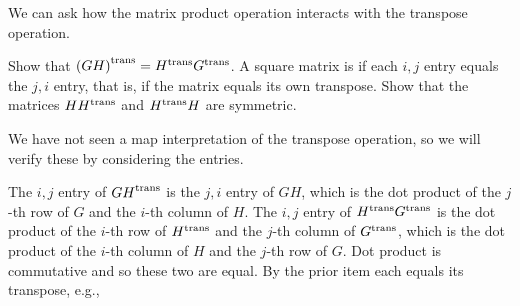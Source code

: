 \begin{exercises}
\begin{answer}
    \end{answer}
  \item \label{exer:TranspAndMult} 
    We can ask how the matrix product 
    operation interacts with the transpose operation. 
    \begin{exparts}  
      \partsitem Show that \( {{(GH)}^{\rm trans}}={{H}^{\rm trans}}{{G}^{\rm trans}} \).
      \partsitem A square matrix is 
         if each 
        \( i,j \) entry equals the
        \( j,i \) entry, that is, if the matrix equals its own transpose.
        Show that
        the matrices \( H{{H}^{\rm trans}} \) and \( {{H}^{\rm trans}}H \) are symmetric.
    \end{exparts}
    \begin{answer}
      We have not seen a map interpretation of the transpose operation, so
      we will verify these by considering the entries.
      \begin{exparts}
        \partsitem  The \( i,j \) entry of \( {{GH}^{\rm trans}} \) is the $j,i$ entry
          of $GH$, which is the dot product of the
          \( j \)-th row of \( G \) and the \( i \)-th column of \( H \).
          The \( i,j \) entry of \( {{H}^{\rm trans}}{{G}^{\rm trans}} \) is the dot product of
          the \( i \)-th row of \( {{H}^{\rm trans}} \) and the \( j \)-th column of
          \( {{G}^{\rm trans}} \), which is the
          dot product of the \( i \)-th column of \( H \) and the
          \( j \)-th row of \( G \).
          Dot product is commutative and so these two are equal.
        \partsitem By the prior item each equals its transpose, e.g.,

\end{exparts}
\end{answer}
\end{exercises}
